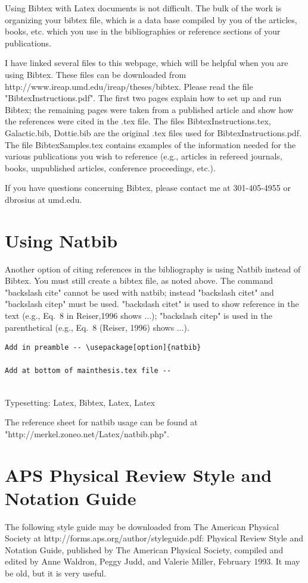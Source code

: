 Using Bibtex with Latex documents is not difficult.  The bulk of the work is organizing your bibtex file, which is a data base compiled by you of the articles, books, etc. which you use in the bibliographies or reference sections of your publications.  

I have linked several files to this webpage, which will be helpful when you are using Bibtex.  These files can be downloaded from \newline
http://www.ireap.umd.edu/ireap/theses/bibtex.  Please read the file "BibtexInstructions.pdf".  The first two pages explain how to set up and run Bibtex; the remaining pages were taken from a published article and show how the references were cited in the .tex file.   The files BibtexInstructions.tex, Galactic.bib, Dottie.bib are the original .tex files used for BibtexInstructions.pdf.  The file BibtexSamples.tex contains examples of the information needed for the various publications you wish to reference (e.g., articles in refereed journals, books, unpublished articles, conference proceedings, etc.).

If you have questions concerning Bibtex, please contact me at 301-405-4955 or dbrosius at umd.edu.

\section{Using Natbib}

Another option of citing references in the bibliography is using Natbib instead of Bibtex.  You must still create a bibtex file, as noted above.  The command "backslash cite" cannot be used with natbib; instead "backslash citet" and "backslash citep" must be used.    "backslash citet" is used to show reference in the text (e.g., Eq.\ 8 in Reiser,1996 shows ...); "backslash citep" is used in the parenthetical (e.g., Eq.\ 8 (Reiser, 1996) shows ...).  

\begin{verbatim}
Add in preamble -- \usepackage[option]{natbib} 

Add at bottom of mainthesis.tex file --


\end{verbatim}

Typesetting:   Latex, Bibtex, Latex, Latex

The reference sheet for natbib usage can be found at \newline "http://merkel.zoneo.net/Latex/natbib.php".

\section{APS Physical Review Style and Notation Guide}

The following style guide may be downloaded from The American Physical Society at http://forms.aps.org/author/styleguide.pdf:  Physical Review Style and Notation Guide, published by The American Physical Society, compiled and edited by Anne Waldron, Peggy Judd, and Valerie Miller, February 1993.  It may be old, but it is very useful.
